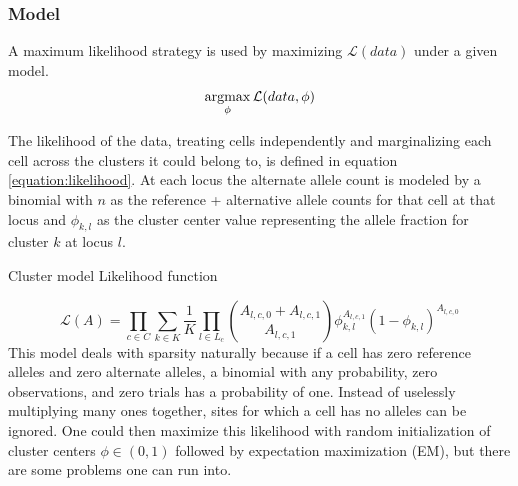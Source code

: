 \noindent
\subsubsection{Model}

A maximum likelihood strategy is used by maximizing $\mathcal{L}(data)$ under a given model. 
\begin{equation}
\operatorname*{argmax}_{\phi} \mathcal{L}(data, \phi)
\end{equation}

The likelihood of the data, treating cells independently and marginalizing each cell across the clusters it could belong to, is defined in equation \ref{equation:likelihood}. At each locus the alternate allele count is modeled by a binomial with $n$ as the reference + alternative allele counts for that cell at that locus and $\phi_{k,l}$ as the cluster center value representing the allele fraction for cluster $k$ at locus $l$.

Cluster model Likelihood function

\begin{equation}\label{equation:likelihood}
\mathcal{L}(A) = \prod_{c \in C} \sum_{k \in K} \frac{1}{K} \prod_{l \in L_c} {A_{l,c,0} + A_{l,c,1}  \choose A_{l,c,1}} \phi^{A_{l,c,1}}_{k,l} (1-\phi_{k,l})^{A_{l,c,0}}
\end{equation}
This model deals with sparsity naturally because if a cell has zero reference alleles and zero alternate alleles, a binomial with any probability, zero observations, and zero trials has a probability of one. Instead of uselessly multiplying many ones together, sites for which a cell has no alleles can be ignored.
One could then maximize this likelihood with random initialization of cluster centers $\phi \in (0,1)$ followed by expectation maximization (EM), but there are some problems one can run into.

